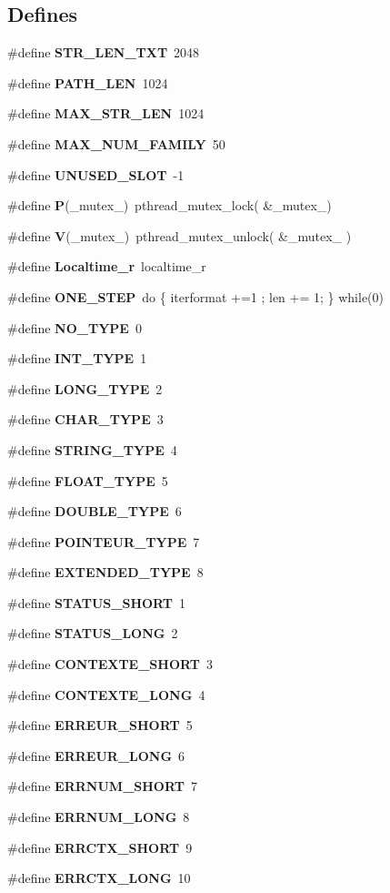 \subsection*{Defines}
\begin{CompactItemize}
\item 
\#define {\bf STR\_\-LEN\_\-TXT}~2048
\item 
\#define {\bf PATH\_\-LEN}~1024
\item 
\#define {\bf MAX\_\-STR\_\-LEN}~1024
\item 
\#define {\bf MAX\_\-NUM\_\-FAMILY}~50
\item 
\#define {\bf UNUSED\_\-SLOT}~-1
\item 
\#define {\bf P}(\_\-mutex\_\-)~pthread\_\-mutex\_\-lock( \&\_\-mutex\_\-)
\item 
\#define {\bf V}(\_\-mutex\_\-)~pthread\_\-mutex\_\-unlock( \&\_\-mutex\_\- )
\item 
\#define {\bf Localtime\_\-r}~localtime\_\-r
\item 
\#define {\bf ONE\_\-STEP}~do \{ iterformat +=1 ; len += 1; \} while(0)
\item 
\#define {\bf NO\_\-TYPE}~0
\item 
\#define {\bf INT\_\-TYPE}~1
\item 
\#define {\bf LONG\_\-TYPE}~2
\item 
\#define {\bf CHAR\_\-TYPE}~3
\item 
\#define {\bf STRING\_\-TYPE}~4
\item 
\#define {\bf FLOAT\_\-TYPE}~5
\item 
\#define {\bf DOUBLE\_\-TYPE}~6
\item 
\#define {\bf POINTEUR\_\-TYPE}~7
\item 
\#define {\bf EXTENDED\_\-TYPE}~8
\item 
\#define {\bf STATUS\_\-SHORT}~1
\item 
\#define {\bf STATUS\_\-LONG}~2
\item 
\#define {\bf CONTEXTE\_\-SHORT}~3
\item 
\#define {\bf CONTEXTE\_\-LONG}~4
\item 
\#define {\bf ERREUR\_\-SHORT}~5
\item 
\#define {\bf ERREUR\_\-LONG}~6
\item 
\#define {\bf ERRNUM\_\-SHORT}~7
\item 
\#define {\bf ERRNUM\_\-LONG}~8
\item 
\#define {\bf ERRCTX\_\-SHORT}~9
\item 
\#define {\bf ERRCTX\_\-LONG}~10

\end{CompactItemize}
